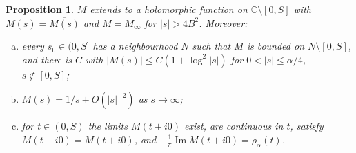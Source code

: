\documentclass[11pt]{amsart}
\numberwithin{equation}{section}
\newtheorem{proposition}[theorem]{Proposition}
\theoremstyle{definition}
\theoremstyle{remark}
\newcommand{\C}{\mathbb{C}}
\DeclareMathOperator{\im}{Im}
\begin{document}
\begin{proposition}\label{prop:M}
$M$ extends to a holomorphic function on $\C\setminus[0,S]$ with
$M(\overline s)=\overline{M(s)}$ and $M=M_\infty$ for $|s|>4B^2$. Moreover:
\begin{enumerate}[(a)]
\item every $s_0\in(0,S]$ has a neighbourhood $N$ such that $M$ is bounded on
$N\setminus[0,S]$, and there is $C$ with $|M(s)|\le C(1+\log^2|s|)$ for
$0<|s|\le\alpha/4$, $s\notin[0,S]$;
\item $M(s)=1/s+O(|s|^{-2})$ as $s\to\infty$;
\item for $t\in(0,S)$ the limits $M(t\pm i0)$ exist, are continuous in $t$,
satisfy $M(t-i0)=\overline{M(t+i0)}$, and
$-\frac1\pi\im M(t+i0)=\rho_\alpha(t)$.
\end{enumerate}
\end{proposition}
\end{document}
